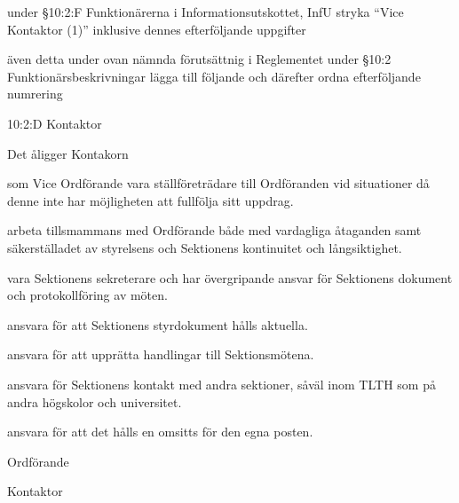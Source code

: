 \documentclass[../_main/handlingar.tex]{subfiles}
\begin{document}
\begin{attsatser}
\begin{description}[font=$\bullet$~\normalfont\scshape\color{black!50!black}]
    
    \item  under §10:2:F Funktionärerna i Informationsutskottet, InfU  stryka  ``Vice Kontaktor (1)'' inklusive dennes efterföljande uppgifter
    \end{description}
    
    \changenote
    
    \newpage
   
    \att även detta under ovan nämnda förutsättnig i Reglementet under §10:2 Funktionärsbeskrivningar lägga till följande och därefter ordna efterföljande numrering
   
    
    10:2:D Kontaktor

    Det åligger Kontakorn

        \begin{attlist}
            \item som Vice Ordförande vara ställföreträdare till Ordföranden vid situationer då denne inte har möjligheten att fullfölja sitt uppdrag.
            \item arbeta tillsmammans med Ordförande både med vardagliga åtaganden samt säkerställadet av styrelsens och Sektionens kontinuitet och långsiktighet.
            \item vara Sektionens sekreterare och har övergripande ansvar för Sektionens dokument och protokollföring av möten. 
            \item ansvara för att Sektionens styrdokument hålls aktuella. 
            \item ansvara för att upprätta handlingar till Sektionsmötena.
            \item ansvara för Sektionens kontakt med andra sektioner, såväl inom TLTH som på andra högskolor och universitet.
            \item ansvara för att det hålls en omsitts för den egna posten.
        \end{attlist}

  
    
\end{attsatser}
 
 


\begin{signatures}{2}
    \ist
    \signature{\ordf}{Ordförande}
    \signature{\sekr}{Kontaktor}

\end{signatures}
\end{document}
